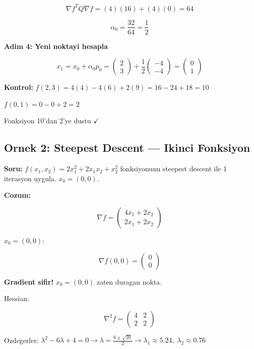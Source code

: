 \documentclass[12pt,a4paper]{article}
\theoremstyle{definition}
\theoremstyle{remark}
\begin{document}
\[
\nabla f^T Q \nabla f = (4)(16) + (4)(0) = 64
\]

\[
\alpha_0 = \frac{32}{64} = \frac{1}{2}
\]

\textbf{Adim 4: Yeni noktayi hesapla}

\[
x_1 = x_0 + \alpha_0 p_0 = \begin{pmatrix} 2 \\ 3 \end{pmatrix} + \frac{1}{2} \begin{pmatrix} -4 \\ -4 \end{pmatrix} = \begin{pmatrix} 0 \\ 1 \end{pmatrix}
\]

\textbf{Kontrol:} $f(2,3) = 4(4) - 4(6) + 2(9) = 16 - 24 + 18 = 10$

$f(0,1) = 0 - 0 + 2 = 2$

Fonksiyon 10'dan 2'ye dustu $\checkmark$

\subsection{Ornek 2: Steepest Descent --- Ikinci Fonksiyon}

\textbf{Soru:} $f(x_1, x_2) = 2x_1^2 + 2x_1 x_2 + x_2^2$ fonksiyonunu steepest descent ile 1 iterasyon uygula. $x_0 = (0, 0)$.

\bigskip
\textbf{Cozum:}

\[
\nabla f = \begin{pmatrix} 4x_1 + 2x_2 \\ 2x_1 + 2x_2 \end{pmatrix}
\]

$x_0 = (0, 0)$:

\[
\nabla f(0,0) = \begin{pmatrix} 0 \\ 0 \end{pmatrix}
\]

\textbf{Gradient sifir!} $x_0 = (0, 0)$ zaten duragan nokta.

Hessian:

\[
\nabla^2 f = \begin{pmatrix} 4 & 2 \\ 2 & 2 \end{pmatrix}
\]

Ozdegerler: $\lambda^2 - 6\lambda + 4 = 0 \rightarrow \lambda = \frac{6 \pm \sqrt{20}}{2} \rightarrow \lambda_1 \approx 5.24,\; \lambda_2 \approx 0.76$
\end{document}
